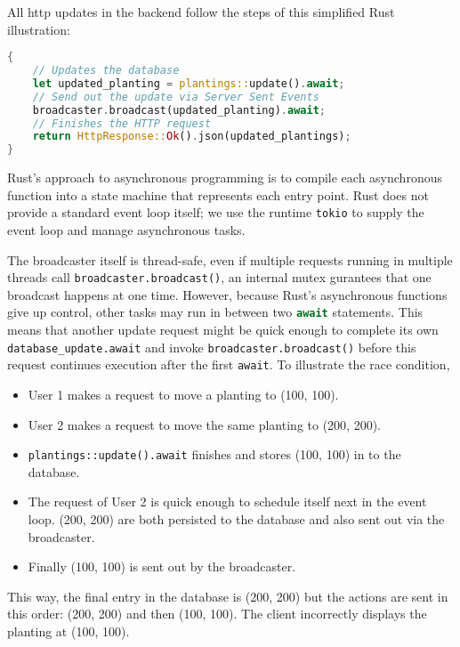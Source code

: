 \documentclass[final,draft,oneside]{vutinfth}
\newcommand{\rustsnippet}[1]{\lstinline[language=rust]{#1}}
\begin{document}
All \gls{http} updates in the backend follow the steps of this simplified Rust illustration: 

\begin{lstlisting}[language=rust]
{
    // Updates the database
    let updated_planting = plantings::update().await;
    // Send out the update via Server Sent Events
    broadcaster.broadcast(updated_planting).await;
    // Finishes the HTTP request
    return HttpResponse::Ok().json(updated_plantings);
}
\end{lstlisting}

Rust's approach to asynchronous programming is to compile each asynchronous function into a state machine that represents each entry point\cite{rustasyncdeepdive2024}.
Rust does not provide a standard event loop itself; we use the runtime \texttt{tokio}\cite{tokiocrate} to supply the event loop and manage asynchronous tasks.

The broadcaster itself is thread-safe, even if multiple requests running in multiple threads call \texttt{broadcaster.broadcast()}, an internal mutex gurantees that one broadcast happens at one time.
However, because Rust's asynchronous functions give up control, other tasks may run in between two \rustsnippet{await} statements.
This means that another update request might be quick enough to complete its own \texttt{database\_update.await} and invoke \texttt{broadcaster.broadcast()} before this request continues execution after the first \texttt{await}. 
To illustrate the race condition,
\begin{itemize}
    \item User 1 makes a request to move a planting to (100, 100).
    \item User 2 makes a request to move the same planting to (200, 200).
    \item \texttt{plantings::update().await} finishes and stores (100, 100) in to the database.
    \item The request of User 2 is quick enough to schedule itself next in the event loop. (200, 200) are both persisted to the database and also sent out via the broadcaster.
    \item Finally (100, 100) is sent out by the broadcaster.
\end{itemize}

This way, the final entry in the database is (200, 200) but the actions are sent in this order: (200, 200) and then (100, 100).
The client incorrectly displays the planting at (100, 100). 
\end{document}
